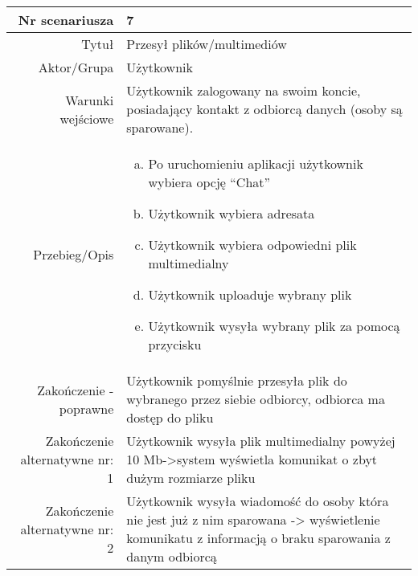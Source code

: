 \documentclass[12pt,a4paper]{article}
\begin{document}
\begin{tabular}{|r|l|} \hline
Nr scenariusza & 7 \\
\hline
Tytuł & Przesył plików/multimediów \\
\hline
Aktor/Grupa & Użytkownik \\
\hline
Warunki wejściowe & Użytkownik zalogowany na swoim koncie, posiadający kontakt z odbiorcą danych (osoby są sparowane).  \\
\hline
Przebieg/Opis & 
\begin{enumerate}[a)]
\item Po uruchomieniu aplikacji użytkownik wybiera opcję “Chat”
\item Użytkownik  wybiera adresata 
\item Użytkownik wybiera odpowiedni plik multimedialny
\item Użytkownik uploaduje wybrany plik 
\item Użytkownik wysyła wybrany plik za pomocą przycisku
\end{enumerate}
\\
\hline
Zakończenie - poprawne & Użytkownik pomyślnie przesyła plik do wybranego przez siebie odbiorcy, odbiorca ma dostęp do pliku  
\\ 
\hline
Zakończenie alternatywne nr: 1 & Użytkownik wysyła plik multimedialny powyżej 10 Mb->system wyświetla komunikat o zbyt dużym rozmiarze pliku
\\
\hline
Zakończenie alternatywne nr: 2 & Użytkownik wysyła wiadomość do osoby która nie jest już z nim sparowana -> wyświetlenie komunikatu z informacją o braku sparowania z danym odbiorcą
\\
\hline
\end{tabular}
\end{document}
